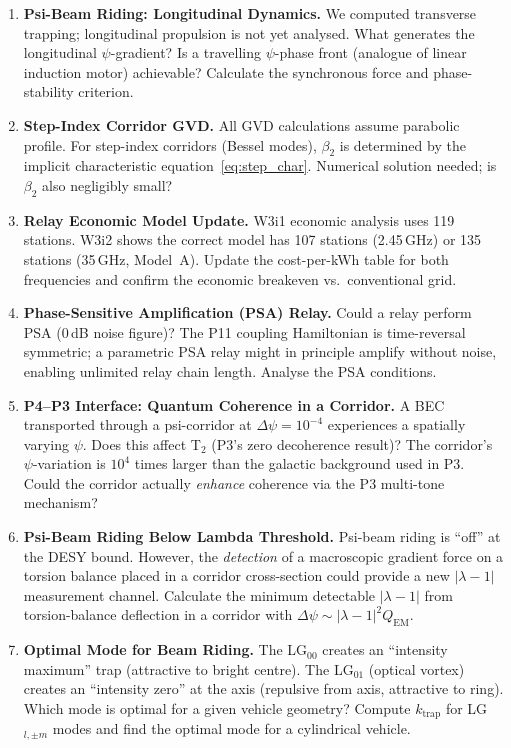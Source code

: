 \documentclass[aps,prd,twocolumn,superscriptaddress]{revtex4-2}
\begin{document}
\begin{enumerate}

\item \textbf{Psi-Beam Riding: Longitudinal Dynamics.}
We computed transverse trapping; longitudinal propulsion is not yet
analysed.  What generates the longitudinal $\psi$-gradient?  Is a
travelling $\psi$-phase front (analogue of linear induction motor)
achievable?  Calculate the synchronous force and phase-stability
criterion.

\item \textbf{Step-Index Corridor GVD.}
All GVD calculations assume parabolic profile.  For step-index
corridors (Bessel modes), $\beta_2$ is determined by the implicit
characteristic equation~\eqref{eq:step_char}.  Numerical solution
needed; is $\beta_2$ also negligibly small?

\item \textbf{Relay Economic Model Update.}
W3i1 economic analysis uses 119 stations.  W3i2 shows the correct
model has 107 stations (2.45\,GHz) or 135 stations (35\,GHz, Model~A).
Update the cost-per-kWh table for both frequencies and confirm the
economic breakeven vs.\ conventional grid.

\item \textbf{Phase-Sensitive Amplification (PSA) Relay.}
Could a relay perform PSA (0\,dB noise figure)?  The P11 coupling
Hamiltonian is time-reversal symmetric; a parametric PSA relay might
in principle amplify without noise, enabling unlimited relay chain
length.  Analyse the PSA conditions.

\item \textbf{P4--P3 Interface: Quantum Coherence in a Corridor.}
A BEC transported through a psi-corridor at $\Delta\psi = 10^{-4}$
experiences a spatially varying $\psi$.  Does this affect T$_2$
(P3's zero decoherence result)?  The corridor's $\psi$-variation
is $10^4$ times larger than the galactic background used in P3.
Could the corridor actually \emph{enhance} coherence via the P3
multi-tone mechanism?

\item \textbf{Psi-Beam Riding Below Lambda Threshold.}
Psi-beam riding is ``off'' at the DESY bound.  However, the
\emph{detection} of a macroscopic gradient force on a torsion balance
placed in a corridor cross-section could provide a new
$|\lambda-1|$ measurement channel.  Calculate the minimum
detectable $|\lambda-1|$ from torsion-balance deflection in a
corridor with $\Delta\psi\sim|\lambda-1|^2 Q_\mathrm{EM}$.

\item \textbf{Optimal Mode for Beam Riding.}
The LG$_{00}$ creates an ``intensity maximum'' trap (attractive
to bright centre).  The LG$_{01}$ (optical vortex) creates an
``intensity zero'' at the axis (repulsive from axis, attractive
to ring).  Which mode is optimal for a given vehicle geometry?
Compute $k_\mathrm{trap}$ for LG$_{l,\pm m}$ modes and find
the optimal mode for a cylindrical vehicle.

\end{enumerate}
\end{document}
